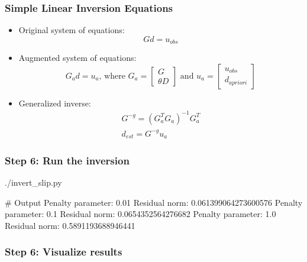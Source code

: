 \documentclass[aspectratio=169]{beamer}
\begin{document}
\begin{frame}
  \frametitle{Simple Linear Inversion Equations}
  \summary{}

  \begin{itemize}
  \item Original system of equations:
    \begin{equation}
      G d = u_\mathit{obs}
    \end{equation}
  \item Augmented system of equations:
    \begin{equation}
      G_a d = u_a \text{, where } 
      G_a = \left[ \begin{array}{c} G \\ \theta D \end{array} \right]
      \text{ and }
      u_a = \left[ \begin{array}{c} u_{obs} \\ d_\mathit{apriori} \end{array} \right]
    \end{equation}
  \item Generalized inverse:
    \begin{gather}
      G^{-g} = \left( G_a^T G_a \right)^{-1} G_a^T \\
      d_{est} = G^{-g} u_a
    \end{gather}
  \end{itemize}
  
\end{frame}


\begin{frame}[fragile]
  \frametitle{Step 6: Run the inversion}
  \summary{}

\begin{bashcode}
  ./invert_slip.py

  # Output
  Penalty parameter:  0.01
  Residual norm:      0.061399064273600576
  Penalty parameter:  0.1
  Residual norm:      0.0654352564276682
  Penalty parameter:  1.0
  Residual norm:      0.5891193688946441
\end{bashcode}
  
\end{frame}


\begin{frame}
  \frametitle{Step 6: Visualize results}

  
\end{frame}

\end{document}
